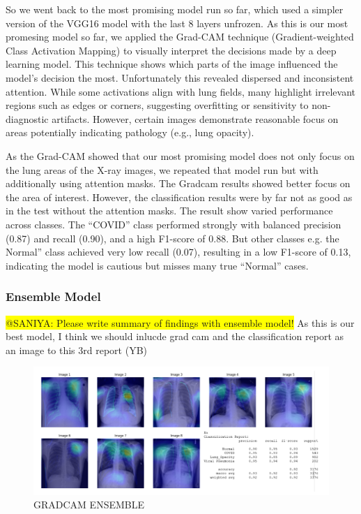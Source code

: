 \documentclass{article}
\begin{document}
So we went back to the most promising model run so far, which used a simpler version of the VGG16 model with the last 8 layers unfrozen. As this is our most promesing model so far, we applied the Grad-CAM technique (Gradient-weighted Class Activation Mapping) to visually interpret the decisions made by a deep learning model. This technique shows which parts of the image influenced the model’s decision the most. Unfortunately this revealed dispersed and inconsistent attention. While some activations align with lung fields, many highlight irrelevant regions such as edges or corners, suggesting overfitting or sensitivity to non-diagnostic artifacts. However, certain images demonstrate reasonable focus on areas potentially indicating pathology (e.g., lung opacity).

As the Grad-CAM showed that our most promising model does not only focus on the lung areas of the X-ray images, we repeated that model run but with additionally using attention masks. The Gradcam results showed better focus on the area of interest. However, the classification results were by far not as good as in the test without the attention masks. The result show varied performance across classes. The “COVID” class performed strongly with balanced precision (0.87) and recall (0.90), and a high F1-score of 0.88. But other classes e.g. the Normal” class achieved very low recall (0.07), resulting in a low F1-score of 0.13, indicating the model is cautious but misses many true “Normal” cases.


\subsubsection {Ensemble Model} 

\colorbox{yellow}{@SANIYA: Please write summary of findings with ensemble model!}
As this is our best model, I think we should inlucde grad cam and the classification report as an image to this 3rd report (YB)


\begin{figure}[ht] %
    \centering
    \includegraphics[width=1.0\linewidth]{ensmeble.png}
    \caption{GRADCAM ENSEMBLE}
    \label{figures_report_2/ensmeble.png}
\end{figure}
\end{document}
